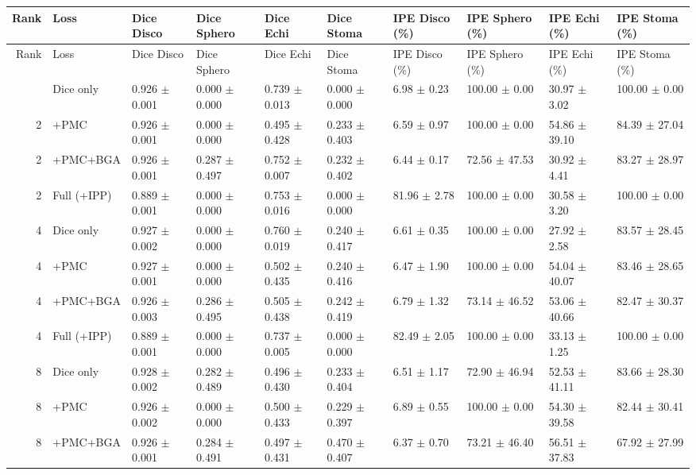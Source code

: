 \documentclass[10pt]{article}
\begin{document}
\begin{landscape}
{\begin{longtable}{r l l l l l l l l l}
\toprule
Rank & Loss & Dice Disco & Dice Sphero & Dice Echi & Dice Stoma & IPE Disco (\%) & IPE Sphero (\%) & IPE Echi (\%) & IPE Stoma (\%) \\
\midrule
\endfirsthead
\toprule
Rank & Loss & Dice Disco & Dice Sphero & Dice Echi & Dice Stoma & IPE Disco (\%) & IPE Sphero (\%) & IPE Echi (\%) & IPE Stoma (\%) \\
\midrule
\endhead
\bottomrule
\endfoot
2 & Dice only & 0.926 $\pm$ 0.001 & 0.000 $\pm$ 0.000 & 0.739 $\pm$ 0.013 & 0.000 $\pm$ 0.000 & 6.98 $\pm$ 0.23 & 100.00 $\pm$ 0.00 & 30.97 $\pm$ 3.02 & 100.00 $\pm$ 0.00 \\
2 & +PMC & 0.926 $\pm$ 0.001 & 0.000 $\pm$ 0.000 & 0.495 $\pm$ 0.428 & 0.233 $\pm$ 0.403 & 6.59 $\pm$ 0.97 & 100.00 $\pm$ 0.00 & 54.86 $\pm$ 39.10 & 84.39 $\pm$ 27.04 \\
2 & +PMC+BGA & 0.926 $\pm$ 0.001 & 0.287 $\pm$ 0.497 & 0.752 $\pm$ 0.007 & 0.232 $\pm$ 0.402 & 6.44 $\pm$ 0.17 & 72.56 $\pm$ 47.53 & 30.92 $\pm$ 4.41 & 83.27 $\pm$ 28.97 \\
2 & Full (+IPP) & 0.889 $\pm$ 0.001 & 0.000 $\pm$ 0.000 & 0.753 $\pm$ 0.016 & 0.000 $\pm$ 0.000 & 81.96 $\pm$ 2.78 & 100.00 $\pm$ 0.00 & 30.58 $\pm$ 3.20 & 100.00 $\pm$ 0.00 \\
4 & Dice only & 0.927 $\pm$ 0.002 & 0.000 $\pm$ 0.000 & 0.760 $\pm$ 0.019 & 0.240 $\pm$ 0.417 & 6.61 $\pm$ 0.35 & 100.00 $\pm$ 0.00 & 27.92 $\pm$ 2.58 & 83.57 $\pm$ 28.45 \\
4 & +PMC & 0.927 $\pm$ 0.001 & 0.000 $\pm$ 0.000 & 0.502 $\pm$ 0.435 & 0.240 $\pm$ 0.416 & 6.47 $\pm$ 1.90 & 100.00 $\pm$ 0.00 & 54.04 $\pm$ 40.07 & 83.46 $\pm$ 28.65 \\
4 & +PMC+BGA & 0.926 $\pm$ 0.003 & 0.286 $\pm$ 0.495 & 0.505 $\pm$ 0.438 & 0.242 $\pm$ 0.419 & 6.79 $\pm$ 1.32 & 73.14 $\pm$ 46.52 & 53.06 $\pm$ 40.66 & 82.47 $\pm$ 30.37 \\
4 & Full (+IPP) & 0.889 $\pm$ 0.001 & 0.000 $\pm$ 0.000 & 0.737 $\pm$ 0.005 & 0.000 $\pm$ 0.000 & 82.49 $\pm$ 2.05 & 100.00 $\pm$ 0.00 & 33.13 $\pm$ 1.25 & 100.00 $\pm$ 0.00 \\
8 & Dice only & 0.928 $\pm$ 0.002 & 0.282 $\pm$ 0.489 & 0.496 $\pm$ 0.430 & 0.233 $\pm$ 0.404 & 6.51 $\pm$ 1.17 & 72.90 $\pm$ 46.94 & 52.53 $\pm$ 41.11 & 83.66 $\pm$ 28.30 \\
8 & +PMC & 0.926 $\pm$ 0.002 & 0.000 $\pm$ 0.000 & 0.500 $\pm$ 0.433 & 0.229 $\pm$ 0.397 & 6.89 $\pm$ 0.55 & 100.00 $\pm$ 0.00 & 54.30 $\pm$ 39.58 & 82.44 $\pm$ 30.41 \\
8 & +PMC+BGA & 0.926 $\pm$ 0.001 & 0.284 $\pm$ 0.491 & 0.497 $\pm$ 0.431 & 0.470 $\pm$ 0.407 & 6.37 $\pm$ 0.70 & 73.21 $\pm$ 46.40 & 56.51 $\pm$ 37.83 & 67.92 $\pm$ 27.99 \\

\end{longtable}}
\end{landscape}
\end{document}
